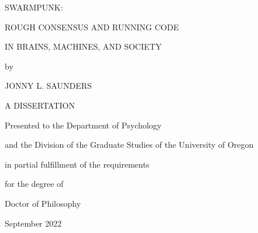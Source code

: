 \begin{titlepage}
\begin{centering}

SWARMPUNK:

ROUGH CONSENSUS AND RUNNING CODE

IN BRAINS, MACHINES, AND SOCIETY

\vspace{3in}

by

JONNY L. SAUNDERS

\vspace{2in}

A DISSERTATION

Presented to the Department of Psychology

and the Division of the Graduate Studies of the University of Oregon

in partial fulfillment of the requirements

for the degree of

Doctor of Philosophy

September 2022

\end{centering}
\end{titlepage}